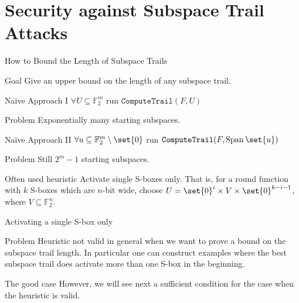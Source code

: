 \documentclass[%
    10pt,
    professionalfont,
    aspectratio=169,
]{beamer}
\newcommand{\F}{\mathbb{F}}
\DeclareMathOperator{\SpanOp}{Span}
\newcommand{\Span}[1]{\SpanOp\set{#1}}
\begin{document}
\section{Security against Subspace Trail Attacks}
\begin{frame}{How to Bound the Length of Subspace Trails}
    \centering
    \begin{block}{Goal}
        Give an upper bound on the length of any subspace trail.
    \end{block}
    \pause

    \begin{minipage}{0.45\textwidth}
    \begin{block}{Na\"ive Approach I}
        $\forall U \subseteq \F_2^m$ run $\texttt{ComputeTrail}(F, U)$
    \end{block}
    \begin{alertblock}{Problem}
        Exponentially many starting subspaces.
    \end{alertblock}
    \end{minipage}%
    \pause%
    \hspace{5pt}%
    \begin{minipage}{0.48\textwidth}
    \begin{block}{Na\"ive Approach II}
        $\forall u \subseteq \F_2^m \setminus \set{0}$ run $\texttt{ComputeTrail}(F, \Span{u})$
    \end{block}
    \begin{alertblock}{Problem}
        Still $2^m-1$ starting subspaces.
    \end{alertblock}
    \end{minipage}
    \pause

    \begin{block}{Often used heuristic}
        Activate single S-boxes only.
        That is, for a round function with $k$ S-boxes which are $n$-bit wide, choose $U = \set{0}^i \times V \times \set{0}^{k-i-1}$, where $V \subseteq \F_2^n$.
    \end{block}
\end{frame}

\begin{frame}{Activating a single S-box only}
    \begin{alertblock}{Problem}
        Heuristic not valid in general when we want to prove a bound on the subspace trail length.
        In particular one can construct examples where the best subspace trail does activate more than one S-box in the beginning.
    \end{alertblock}
    \begin{exampleblock}{The good case}
        However, we will see next a sufficient condition for the case when the heuristic is valid.
    \end{exampleblock}
\end{frame}
\end{document}
